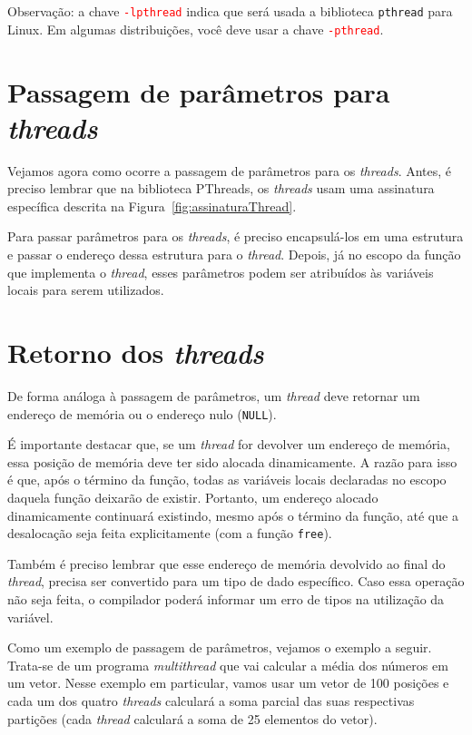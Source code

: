 \textcolor{orange}{\faExclamationTriangle} Observação: a chave \textcolor{red}{\texttt{-lpthread}} indica que será usada a biblioteca \texttt{pthread} para Linux. Em algumas distribuições, você deve usar a chave \textcolor{red}{\texttt{-pthread}}.

\section{Passagem de parâmetros para \textit{threads}}
Vejamos agora como ocorre a passagem de parâmetros para os \textit{threads}. Antes, é preciso lembrar que na biblioteca PThreads, os \textit{threads} usam uma assinatura específica descrita na Figura~\ref{fig:assinaturaThread}. 

Para passar parâmetros para os \textit{threads}, é preciso encapsulá-los em uma estrutura e passar o endereço dessa estrutura para o \textit{thread}. Depois, já no escopo da função que implementa o \textit{thread}, esses parâmetros podem ser atribuídos às variáveis locais para serem utilizados.

\section{Retorno dos \textit{threads}}
De forma análoga à passagem de parâmetros, um \textit{thread} deve retornar um endereço de memória ou o endereço nulo (\texttt{NULL}).  

É importante destacar que, se um \textit{thread} for devolver um endereço de memória, essa posição de memória deve ter sido alocada dinamicamente. A razão para isso é que, após o término da função, todas as variáveis locais declaradas no escopo daquela função deixarão de existir. Portanto, um endereço alocado dinamicamente continuará existindo, mesmo após o término da função, até que a desalocação seja feita explicitamente (com a função \texttt{free}).

Também é preciso lembrar que esse endereço de memória devolvido ao final do \textit{thread}, precisa ser convertido para um tipo de dado específico. Caso essa operação não seja feita, o compilador poderá informar um erro de tipos na utilização da variável.

Como um exemplo de passagem de parâmetros, vejamos o exemplo a seguir. Trata-se de um programa \textit{multithread} que vai calcular a média dos números em um vetor. Nesse exemplo em particular, vamos usar um vetor de 100 posições e cada um dos quatro \textit{threads} calculará a soma parcial das suas respectivas partições (cada \textit{thread} calculará a soma de 25 elementos do vetor).

